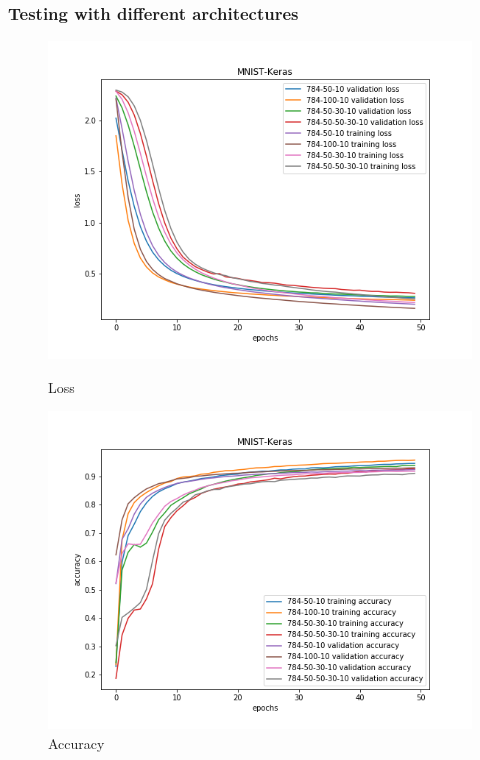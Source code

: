 \documentclass{article}
\begin{document}
\subsubsection{Testing with different architectures}

\begin{figure}[!htb]
	\includegraphics[width=\linewidth]{../output_plots/part_1_task_4_best_loss.png}
	\caption{Loss}\label{fig:part_1_task_4_best_loss}
	\endminipage\hfill
	\includegraphics[width=\linewidth]{../output_plots/part_1_task_4_best_accuracy.png}
	\caption{Accuracy}\label{fig:part_1_task_4_best_accuracy}
	\endminipage\hfill
\end{figure}
\end{document}
